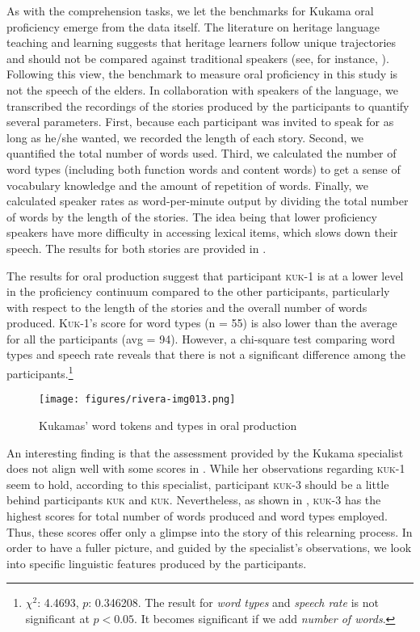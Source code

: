 \documentclass[output=paper]{langscibook}
\begin{document}
As with the comprehension tasks, we let the benchmarks for Kukama oral proficiency emerge from the data itself. The literature on heritage language teaching and learning suggests that heritage learners follow unique trajectories and should not be compared against traditional speakers (see, for instance, \citealt{Valdés2005}). Following this view, the benchmark to measure oral proficiency in this study is not the speech of the elders. In collaboration with speakers of the language, we transcribed the recordings of the stories produced by the participants to quantify several parameters. First, because each participant was invited to speak for as long as he/she wanted, we recorded the length of each story. Second, we quantified the total number of words used. Third, we calculated the number of word types (including both function words and content words) to get a sense of vocabulary knowledge and the amount of repetition of words. Finally, we calculated speaker rates as word-per-minute output by dividing the total number of words by the length of the stories. The idea being that lower proficiency speakers have more difficulty in accessing lexical items, which slows down their speech. The results for both stories are provided in .

The results for oral production suggest that participant \textsc{kuk}{}-1 is at a lower level in the proficiency continuum compared to the other participants, particularly with respect to the length of the stories and the overall number of words produced. \textsc{Kuk}{}-1’s score for word types (n = 55) is also lower than the average for all the participants (avg = 94). However, a chi-square test comparing word types and speech rate reveals that there is not a significant difference among the participants.\footnote{$\chi^2$: 4.4693, $p$: 0.346208. The result for \textit{word types} and \textit{speech rate} is not significant at $p < 0.05$. It becomes significant if we add \textit{number of words}.}

\begin{figure}
\caption{Kukamas’ word tokens and types in oral production}
\label{fig:7:3}
\texttt{[image: figures/rivera-img013.png]}
\end{figure}


An interesting finding is that the assessment provided by the Kukama specialist does not align well with some scores in . While her observations regarding \textsc{kuk}{}-1 seem to hold, according to this specialist, participant \textsc{kuk}{}-3 should be a little behind participants \textsc{kuk} and \textsc{kuk}. Nevertheless, as shown in , \textsc{kuk}{}-3 has the highest scores for total number of words produced and word types employed. Thus, these scores offer only a glimpse into the story of this relearning process. In order to have a fuller picture, and guided by the specialist’s observations, we look into specific linguistic features produced by the participants.
\end{document}
